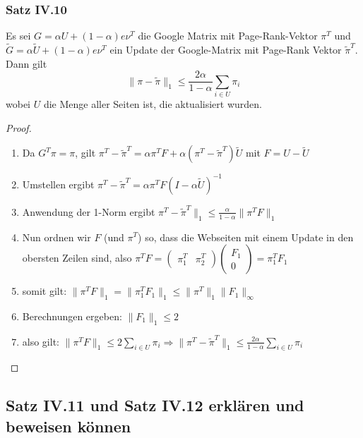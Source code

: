 \documentclass[]{article}
\begin{document}
\subsubsection*{Satz IV.10}
Es sei $G = \alpha U + (1- \alpha) e \nu^T$ die Google Matrix mit Page-Rank-Vektor $\pi^T$ und $\tilde{G} = \alpha \tilde{U} + (1- \alpha) e \nu^T$ ein Update der Google-Matrix mit Page-Rank Vektor $\tilde{\pi}^T$. Dann gilt
\begin{equation}
\| \pi - \tilde{\pi}\|_1 \leq \frac{2 \alpha}{1- \alpha} \sum_{i \in U} \pi_i
\end{equation}
wobei $U$ die Menge aller Seiten ist, die aktualisiert wurden.

\begin{proof}
	\begin{enumerate}
		\item Da $G^T \pi = \pi$, gilt $\pi^T - \tilde{\pi}^T = \alpha \pi^T F + \alpha(\pi^T - \tilde{\pi}^T) \tilde{U}$ mit $F= U - \tilde{U}$
		\item Umstellen ergibt $\pi^T - \tilde{\pi}^T = \alpha \pi^T F (I - \alpha \tilde{U})^{-1}$
		\item Anwendung der 1-Norm ergibt $\pi^T - \tilde{\pi}^T \|_1 \leq \frac{\alpha}{1- \alpha} \|\pi^T F\|_1$
		\item 	Nun ordnen wir $F$ (und $\pi^T$) so, dass die Webseiten mit einem Update in den obersten Zeilen sind, also $\pi^T F = \begin{pmatrix} \pi^T_1 & \pi^T_2 \end{pmatrix} \begin{pmatrix} F_1 \\ 0 \end{pmatrix} = \pi^T_1 F_1$
		\item somit gilt: $\|\pi^T F\|_1 = \|\pi^T_1 F_1\|_1 \leq \|\pi^T\|_1 \|F_1\|_{\infty}$
		\item Berechnungen ergeben: $\|F_1\|_1 \leq 2$ 
		\item also gilt: $	\|\pi^T F\|_1 \leq 2 \sum_{i \in U} \pi_i \Rightarrow \|\pi^T - \tilde{\pi}^T\|_1 \leq \frac{2\alpha}{1-\alpha} \sum_{i \in U} \pi_i$
	\end{enumerate}
\end{proof}



\subsection*{Satz IV.11 und Satz IV.12 erklären und beweisen können}
\end{document}
